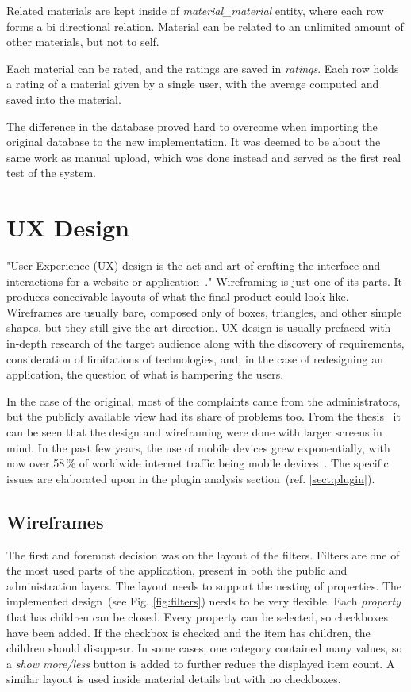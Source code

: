 \documentclass[
  digital,     %
  oneside,     %
  nosansbold,  %
  colorbold, %
  lof,         %
  lot,         %
]{fithesis4}
\newcommand{\imgref}[1]{(see Fig. \ref{fig:#1})}
\newcommand{\cref}[1]{(ref. \ref{#1})}
\begin{document}
Related materials are kept inside of \textit{material\_material} entity, where each row forms a bi
directional relation. Material can be related to an unlimited amount of other materials, but not to
self.

Each material can be rated, and the ratings are saved in \textit{ratings}. Each row holds a rating of a
material given by a single user, with the average computed and saved into the material.

The difference in the database proved hard to overcome when importing the original database to the
new implementation. It was deemed to be about the same work as manual upload, which was done
instead and served as the first real test of the system.

\section{UX Design}

"User Experience (UX) design is the act and art of crafting the interface and interactions for a website
or application~\cite{hamm14}." Wireframing is just one of its parts. It produces conceivable layouts of
what the final product could look like. Wireframes are usually bare, composed only of boxes,
triangles, and other simple shapes, but they still give the art direction. UX design is usually prefaced
with in-depth research of the target audience along with the discovery of requirements,
consideration of limitations of technologies, and, in the case of redesigning an application, the
question of what is hampering the users.

In the case of the original, most of the complaints came from the administrators, but the publicly
available view had its share of problems too. From the thesis~\cite{lang18} it can be seen that the
design and wireframing were done with larger screens in mind. In the past few years, the use of
mobile devices grew exponentially, with now over 58\,\% of worldwide internet traffic being mobile
devices~\cite{mobile_usage}. The specific issues are elaborated upon in the plugin analysis
section~\cref{sect:plugin}.

\subsection{Wireframes}

The first and foremost decision was on the layout of the filters. Filters are one of the most used parts
of the application, present in both the public and administration layers. The layout needs to support
the nesting of properties. The implemented design~\imgref{filters} needs to be very flexible. Each
\textit{property} that has children can be closed. Every property can be selected, so checkboxes have
been added. If the checkbox is checked and the item has children, the children should disappear. In
some cases, one category contained many values, so a \textit{show more/less} button is added to
further reduce the displayed item count. A similar layout is used inside material details but with no
checkboxes.
\end{document}
